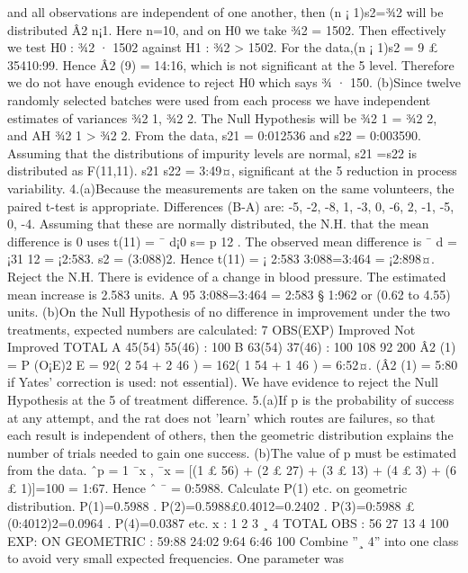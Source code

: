\documentclass{article}
\begin{document}
and all observations are independent of one another, then (n ¡ 1)s2=¾2 will be distributed Â2
n¡1.
Here n=10, and on H0 we take ¾2 = 1502. Then effectively we test H0 : ¾2 · 1502 against
H1 : ¾2 > 1502.
For the data,(n ¡ 1)s2 = 9 £ 35410:99. Hence Â2
(9) = 14:16, which is not significant at the 5%
level. Therefore we do not have enough evidence to reject H0 which says ¾ · 150.
(b)Since twelve randomly selected batches were used from each process we have independent estimates
of variances ¾2
1, ¾2
2. The Null Hypothesis will be ¾2
1 = ¾2
2, and AH ¾2
1 > ¾2
2.
From the data, s21
= 0:012536 and s22
= 0:003590.
Assuming that the distributions of impurity levels are normal, s21
=s22
is distributed as F(11,11).
s21
s22
= 3:49¤, significant at the 5%
reduction in process variability.
4.(a)Because the measurements are taken on the same volunteers, the paired t-test is appropriate.
Differences (B-A) are: -5, -2, -8, 1, -3, 0, -6, 2, -1, -5, 0, -4.
Assuming that these are normally distributed, the N.H. that the mean difference is 0
uses t(11) = ¯ d¡0
s=
p
12
.
The observed mean difference is ¯ d = ¡31
12 = ¡2:583. s2 = (3:088)2.
Hence t(11) = ¡ 2:583
3:088=3:464 = ¡2:898¤.
Reject the N.H. There is evidence of a change in blood pressure.
The estimated mean increase is 2.583 units. A 95%
3:088=3:464 = 2:583 § 1:962 or (0.62 to 4.55) units.
(b)On the Null Hypothesis of no difference in improvement under the two treatments, expected
numbers are calculated:
7
OBS(EXP) Improved Not Improved TOTAL
A 45(54) 55(46) : 100
B 63(54) 37(46) : 100
108 92 200
Â2
(1) =
P (O¡E)2
E = 92( 2
54 + 2
46 ) = 162( 1
54 + 1
46 ) = 6:52¤.
(Â2
(1) = 5:80 if Yates’ correction is used: not essential).
We have evidence to reject the Null Hypothesis at the 5%
of treatment difference.
5.(a)If p is the probability of success at any attempt, and the rat does not ’learn’ which routes are
failures, so that each result is independent of others, then the geometric distribution explains the
number of trials needed to gain one success.
(b)The value of p must be estimated from the data.
ˆp = 1
¯x , ¯x = [(1 £ 56) + (2 £ 27) + (3 £ 13) + (4 £ 3) + (6 £ 1)]=100 = 1:67.
Hence ˆ ¯ = 0:5988. Calculate P(1) etc. on geometric distribution.
P(1)=0.5988 . P(2)=0.5988£0.4012=0.2402 .
P(3)=0:5988 £ (0:4012)2=0.0964 . P(4)=0.0387 etc.
x : 1 2 3 ¸ 4 TOTAL
OBS : 56 27 13 4 100
EXP: ON GEOMETRIC : 59:88 24:02 9:64 6:46 100
Combine ”¸ 4” into one class to avoid very small expected frequencies. One parameter was
\end{document}
